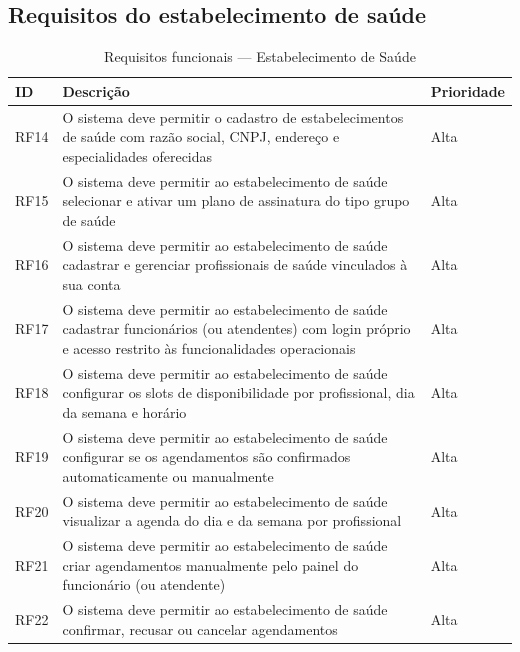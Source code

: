 \subsection{Requisitos do estabelecimento de saúde}
\label{subsec:clinic-requirements}

\begin{table}[H]
  \centering
  \caption{Requisitos funcionais --- Estabelecimento de Saúde}
  \label{tab:clinic-requirements}
  \begin{tabular}{p{1.2cm}p{6.5cm}p{2.5cm}}
    \toprule
    \textbf{ID} &
    \textbf{Descrição} &
    \textbf{Prioridade} \\
    \midrule
    RF14 & O sistema deve permitir o cadastro de
           estabelecimentos de saúde com razão social, CNPJ,
           endereço e especialidades oferecidas
         & Alta \\
    RF15 & O sistema deve permitir ao estabelecimento de saúde
           selecionar e ativar um plano de
           assinatura do tipo grupo de saúde
         & Alta \\
    RF16 & O sistema deve permitir ao estabelecimento de saúde
           cadastrar e gerenciar profissionais
           de saúde vinculados à sua conta
         & Alta \\
    RF17 & O sistema deve permitir ao estabelecimento de saúde
           cadastrar funcionários (ou atendentes)
           com login próprio e acesso restrito
           às funcionalidades operacionais
         & Alta \\
    RF18 & O sistema deve permitir ao estabelecimento de saúde
           configurar os slots de disponibilidade
           por profissional, dia da semana
           e horário
         & Alta \\
    RF19 & O sistema deve permitir ao estabelecimento de saúde
           configurar se os agendamentos são
           confirmados automaticamente ou
           manualmente
         & Alta \\
    RF20 & O sistema deve permitir ao estabelecimento de saúde
           visualizar a agenda do dia e da
           semana por profissional
         & Alta \\
    RF21 & O sistema deve permitir ao estabelecimento de saúde
           criar agendamentos manualmente pelo
           painel do funcionário (ou atendente)
         & Alta \\
    RF22 & O sistema deve permitir ao estabelecimento de saúde
           confirmar, recusar ou cancelar
           agendamentos
         & Alta \\

\end{tabular}
\end{table}
